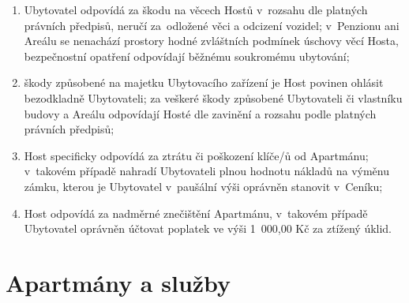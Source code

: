 \documentclass[a4paper]{scrartcl}
\begin{document}
\begin{enumerate}
\begin{enumerate}
          \item
                Ubytovatel odpovídá za škodu na věcech Hostů v~rozsahu dle
                platných právních předpisů, neručí za~odložené věci a odcizení
                vozidel; v~Penzionu ani Areálu se nenachází prostory hodné
                zvláštních podmínek úschovy věcí Hosta, bezpečnostní opatření
                odpovídají běžnému soukromému ubytování;
          \item
                škody způsobené na majetku Ubytovacího zařízení je Host povinen
                ohlásit bezodkladně Ubytovateli; za veškeré škody způsobené
                Ubytovateli či vlastníku budovy a Areálu odpovídají Hosté dle
                zavinění a rozsahu podle platných právních předpisů;
          \item
                Host specificky odpovídá za ztrátu či poškození klíče/ů od
                Apartmánu; v~takovém případě nahradí Ubytovateli plnou hodnotu
                nákladů na výměnu zámku, kterou je Ubytovatel v~paušální výši
                oprávněn stanovit v~Ceníku;
          \item
                Host odpovídá za nadměrné znečištění Apartmánu, v~takovém případě
                Ubytovatel oprávněn účtovat poplatek ve výši 1~000,00 Kč za
                ztížený úklid.
        \end{enumerate}
\end{enumerate}

\section{Apartmány a služby}
\end{document}

